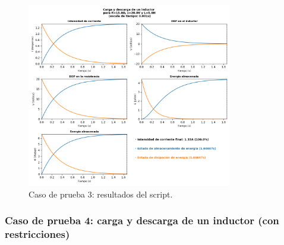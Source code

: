 \documentclass[../main.tex]{subfiles}
\begin{document}
\begin{figure}[!h]
    \centering
    \includegraphics[width=0.8\textwidth]{images/cp3-py.png}
    \caption{Caso de prueba 3: resultados del script. }
    \label{fig::cp3-py}
\end{figure}




\subsubsection{Caso de prueba 4: carga y descarga de un inductor (con restricciones)}
\end{document}
